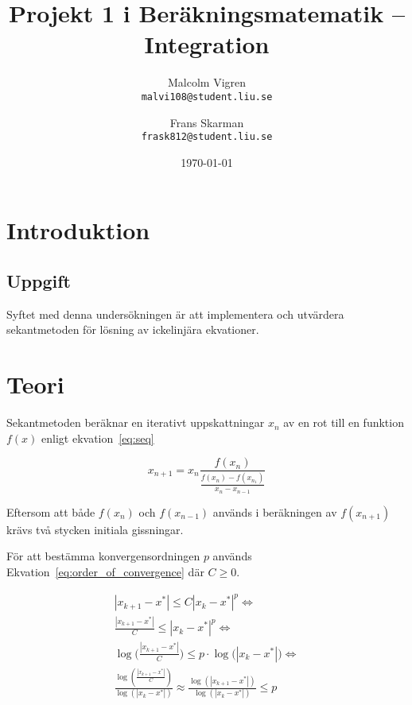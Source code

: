 \documentclass[a4paper,titlepage]{article}
\title{
    \textbf{Projekt 1 i Beräkningsmatematik -- Integration }}
\date{\today}
\author{%
    Malcolm Vigren \\
    \texttt{malvi108@student.liu.se}
    \and
    Frans Skarman\\
    \texttt{frask812@student.liu.se}
    }
\begin{document}
\maketitle
\newpage
\tableofcontents
\newpage

\section{Introduktion}

\subsection{Uppgift}

Syftet med denna undersökningen är att implementera och utvärdera sekantmetoden
för lösning av ickelinjära ekvationer.


\section{Teori}

Sekantmetoden beräknar en iterativt uppskattningar $x_n$ av en rot till en
funktion $f(x)$ enligt ekvation~\ref{eq:seq}

\begin{equation}
    \label{eq:seq}
    x_{n+1} = x_{n}
    \frac{f(x_n)}
        {\frac{f(x_n) - f(x_{n_1})}
                {x_n - x_{n-1}}
        }
\end{equation}

Eftersom att både $f(x_n)$ och $f(x_{n-1})$ används i beräkningen av $f(x_{n+1})$ krävs
två stycken initiala gissningar.


För att bestämma konvergensordningen $p$ används Ekvation~\ref{eq:order_of_convergence} där
$C \geq 0$.

\begin{equation}
    \begin{gathered}
        |x_{k+1} - x^*| \leq C |x_k - x^*|^p \Leftrightarrow \\
        \frac{|x_{k+1} - x^*|}{C} \leq |x_{k} - x^*|^p \Leftrightarrow \\
        \log\big(\frac{|x_{k+1} - x^*|}{C} \big) \leq
            p \cdot \log\big(|x_{k} - x^*|\big) \Leftrightarrow \\
        \frac{\log(\frac{|x_{k+1} - x^*|}{C})}
            {\log(|x_{k} - x^*|)}
        \approx \frac{\log(|x_{k+1} - x^*|)}
            {\log(|x_{k} - x^*|)} \leq p \\
    \end{gathered}
    \label{eq:order_of_convergence}
\end{equation}
\end{document}
